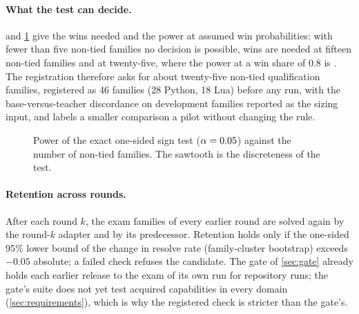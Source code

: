 \begin{table}[tbp]
\centering\small

\caption{The exact one-sided sign test at $\alpha=\alphalevel$: wins required and power if
each non-tied family is a win with the stated probability (a design calculation computed by
, not a measurement).}\label{tab:design}
\end{table}

\paragraph{What the test can decide.}  and \cref{fig:power} give the wins
needed and the power at assumed win probabilities: with fewer than five non-tied families no
decision is possible, \mDesignNOneFiveWins{} wins are needed at fifteen non-tied families
and \mDesignNTwoFiveWins{} at twenty-five, where the power at a win share of 0.8 is
\mDesignNTwoFivePowerEightZero{}. The registration therefore asks for about
twenty-five non-tied qualification families, registered as 46 families (28 Python, 18 Lua) before any run, with the base-versus-teacher
discordance on development families reported as the sizing input, and labels a smaller comparison a pilot without changing the
rule.

\begin{figure}[tbp]
\centering
{}
\caption{Power of the exact one-sided sign test ($\alpha=\alphalevel$) against the number of
non-tied families. The sawtooth is the discreteness of the test.}\label{fig:power}
\end{figure}

\paragraph{Retention across rounds.} After each round $k$, the exam families of every earlier
round are solved again by the round-$k$ adapter and by its predecessor. Retention holds only if
the one-sided 95\% lower bound of the change in resolve rate (family-cluster bootstrap) exceeds
$-0.05$ absolute; a failed check refuses the candidate. The gate of
\cref{sec:gate} already holds each earlier release to the exam of its own run for repository
runs; the gate's suite does not yet test acquired capabilities in every domain
(\cref{sec:requirements}), which is why the registered check is stricter
than the gate's.

